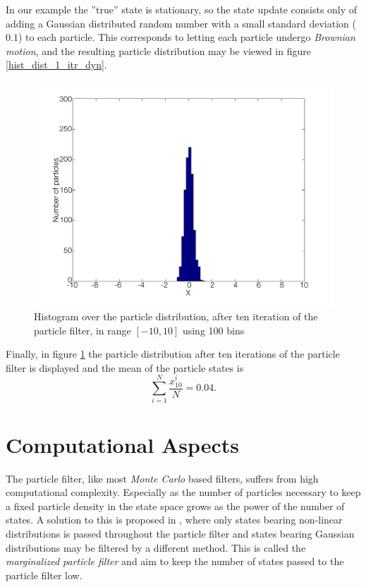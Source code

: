 \documentclass{LTHthesis}
\begin{document}
In our example the ''true'' state is stationary, so the state update consists only of adding a Gaussian distributed random number with a small standard deviation ($0.1$) to each particle. This corresponds to letting each particle undergo \emph{Brownian motion}, and the resulting particle distribution may be viewed in figure \ref{hist_dist_1_itr_dyn}.
%
\begin{figure}[!hbt]

\includegraphics[width=1\textwidth ]{images/PF/hist_dist_10_itr}
\caption{Histogram over the particle distribution, after ten iteration of the particle filter, in range $[-10,10]$ using 100 bins}\label{hist_dist_10_itr}
\end{figure}

Finally, in figure \ref{hist_dist_10_itr} the particle distribution after ten iterations of the particle filter is displayed and the mean of the particle states is
\begin{equation}
\sum^{N}_{i=1}{\frac{x^i_{10}}{N}} = 0.04.
\end{equation} 
%
\section{Computational Aspects}
\label{sec:com_asp}
%
The particle filter, like most \emph{Monte Carlo} based filters, suffers from high computational complexity. Especially as the number of particles necessary to keep a fixed particle density in the state space grows as the power of the number of states. A solution to this is proposed in \cite{gson12}, where only states bearing non-linear distributions is passed throughout the particle filter and states bearing Gaussian distributions may be filtered by a different method. This is called the \emph{marginalized particle filter} and aim to keep the number of states passed to the particle filter low. 
\end{document}
